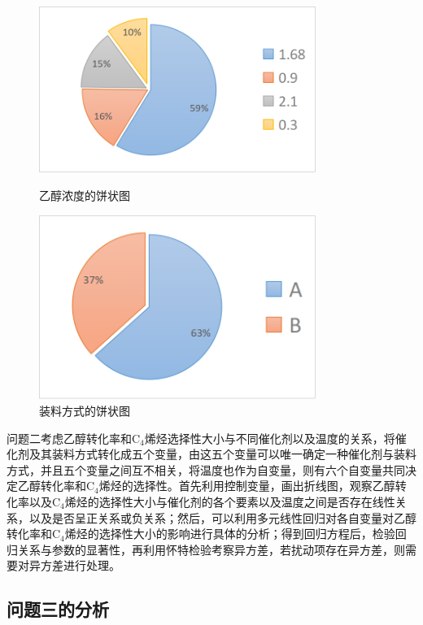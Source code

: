 \documentclass[a4paper,10.5pt]{ctexart}
\begin{document}
\begin{figure}[h]
\centering
\begin{minipage}[t]{0.48\textwidth}
\centering
\includegraphics[width=9cm]{乙醇浓度.png}
\caption{乙醇浓度的饼状图}
\end{minipage}
\begin{minipage}[t]{0.48\textwidth}
\centering
\includegraphics[width=9cm]{装料方式.png}
\caption{装料方式的饼状图}
\end{minipage}
\end{figure}
问题二考虑乙醇转化率和C$_4$烯烃选择性大小与不同催化剂以及温度的关系，将催化剂及其装料方式转化成五个变量，由这五个变量可以唯一确定一种催化剂与装料方式，并且五个变量之间互不相关，将温度也作为自变量，则有六个自变量共同决定乙醇转化率和C$_4$烯烃的选择性。首先利用控制变量，画出折线图，观察乙醇转化率以及C$_4$烯烃的选择性大小与催化剂的各个要素以及温度之间是否存在线性关系，以及是否呈正关系或负关系；然后，可以利用多元线性回归对各自变量对乙醇转化率和C$_4$烯烃的选择性大小的影响进行具体的分析；得到回归方程后，检验回归关系与参数的显著性，再利用怀特检验考察异方差，若扰动项存在异方差，则需要对异方差进行处理。

\subsection{问题三的分析}

\end{document}
